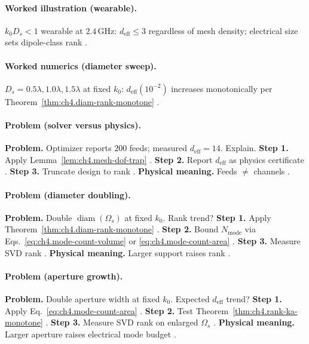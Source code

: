 \paragraph{Worked illustration (wearable).}
\(k_{0}D_{s}<1\) wearable at \(2.4\,\mathrm{GHz}\): \(d_{\mathrm{eff}}\le3\) regardless of mesh density; electrical size sets dipole-class rank
\cite{harrington2001,jackson1999,stratton1941,devaney2004}.

\paragraph{Worked numerics (diameter sweep).}
\(D_{s}=0.5\lambda,1.0\lambda,1.5\lambda\) at fixed \(k_{0}\): \(d_{\mathrm{eff}}(10^{-2})\) increases monotonically per Theorem~\ref{thm:ch4.diam-rank-monotone}
\cite{hansen1988,harrington2001,stratton1941,devaney2004,collin2001}.

\paragraph{Problem (solver versus physics).}
\textbf{Problem.} Optimizer reports \(200\) feeds; measured \(d_{\mathrm{eff}}=14\). Explain.
\textbf{Step 1.} Apply Lemma~\ref{lem:ch4.mesh-dof-trap} \cite{harrington2001,devaney2004}.
\textbf{Step 2.} Report \(d_{\mathrm{eff}}\) as physics certificate \cite{hansen1988,stratton1941}.
\textbf{Step 3.} Truncate design to rank \cite{jackson1999,collin2001}.
\textbf{Physical meaning.} Feeds \(\neq\) channels \cite{harrington2001}.

\paragraph{Problem (diameter doubling).}
\textbf{Problem.} Double \(\operatorname{diam}(\Omega_{s})\) at fixed \(k_{0}\). Rank trend?
\textbf{Step 1.} Apply Theorem~\ref{thm:ch4.diam-rank-monotone} \cite{stratton1941,hansen1988}.
\textbf{Step 2.} Bound \(N_{\mathrm{mode}}\) via Eqs.~\eqref{eq:ch4.mode-count-volume} or \eqref{eq:ch4.mode-count-area} \cite{jackson1999,harrington2001}.
\textbf{Step 3.} Measure SVD rank \cite{devaney2004,collin2001}.
\textbf{Physical meaning.} Larger support raises rank \cite{stratton1941}.

\paragraph{Problem (aperture growth).}
\textbf{Problem.} Double aperture width at fixed \(k_{0}\). Expected \(d_{\mathrm{eff}}\) trend?
\textbf{Step 1.} Apply Eq.~\eqref{eq:ch4.mode-count-area} \cite{collin2001,hansen1988}.
\textbf{Step 2.} Test Theorem~\ref{thm:ch4.rank-ka-monotone} \cite{harrington2001,jackson1999}.
\textbf{Step 3.} Measure SVD rank on enlarged \(\Omega_{s}\) \cite{devaney2004,stratton1941}.
\textbf{Physical meaning.} Larger aperture raises electrical mode budget \cite{hansen1988}.


